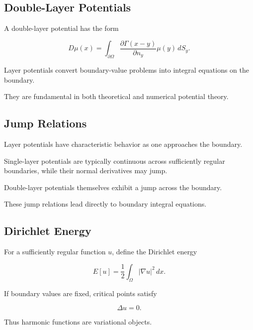 \subsection{Double-Layer Potentials}
\label{subsec:double-layer-potentials}

A double-layer potential has the form

\[
\boxed{
D\mu(x)
=
\int_{\partial\Omega}
\frac{\partial\Gamma(x-y)}
{\partial n_y}
\mu(y)\,dS_y.
}
\]

Layer potentials convert boundary-value problems into integral equations
on the boundary.

They are fundamental in both theoretical and numerical potential theory.

\subsection{Jump Relations}
\label{subsec:layer-potential-jump-relations}

Layer potentials have characteristic behavior as one approaches the
boundary.

Single-layer potentials are typically continuous across sufficiently
regular boundaries, while their normal derivatives may jump.

Double-layer potentials themselves exhibit a jump across the boundary.

These jump relations lead directly to boundary integral equations.

\subsection{Dirichlet Energy}
\label{subsec:potential-dirichlet-energy}

For a sufficiently regular function \(u\), define the Dirichlet energy

\[
\boxed{
E[u]
=
\frac12
\int_\Omega
|\nabla u|^2\,dx.
}
\]

If boundary values are fixed, critical points satisfy

\[
\boxed{
\Delta u=0.
}
\]

Thus harmonic functions are variational objects.

